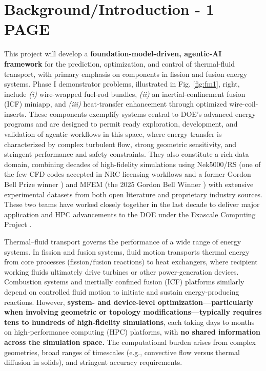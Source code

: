 

\section{Background/Introduction  -   1 PAGE}

This project will develop a {\bf foundation-model-driven, agentic-AI framework}
\cite{Vinuesa2026XAI} for the prediction, optimization, and control of
thermal-fluid transport, with primary emphasis on components in fission and
fusion energy systems.
  Phase I demonstrator problems, illustrated in Fig.  \ref{fig:fm1}, right, 
include 
{\em (i)} wire-wrapped fuel-rod bundles, 
{\em (ii)} an inertial-confinement fusion (ICF) miniapp, and 
{\em (iii)} heat-transfer enhancement through optimized wire-coil-inserts.
  These components exemplify systems central to DOE’s advanced energy
programs and are designed to permit ready exploration, development, and
validation of agentic workflows in this space, where
    energy transfer is characterized by complex turbulent flow, strong
geometric sensitivity, and stringent performance and safety constraints.
  They also constitute a rich data domain, combining decades of high-fidelity
simulations using Nek5000/RS (one of the few CFD codes accepted in NRC
licensing workflows and a former Gordon Bell Prize winner
\cite{tufo99a,gb23}) and MFEM (the 2025 Gordon Bell Winner \cite{gb25mfem}) 
with extensive experimental datasets from both open literature and proprietary
industry sources.  These two teams have worked closely together in the last
decade to deliver major application and HPC advancements to the DOE under the
Exascale Computing Project \cite{ceed}.





Thermal–fluid transport governs the performance of a wide range of energy systems.
In fission and fusion systems, fluid motion transports thermal energy
from core processes (fission/fusion reactions) to heat exchangers, where 
recipient working fluids ultimately drive turbines or other power-generation devices.
Combustion systems and inertially confined fusion (ICF) platforms similarly
depend on controlled fluid motion to initiate and sustain energy-producing
reactions.
However, {\bf system- and device-level optimization—particularly when involving
geometric or topology modifications—typically requires tens to hundreds of
high-fidelity simulations}, each taking days to months on high-performance
computing (HPC) platforms,
with {\bf no shared information across the simulation space.} The computational
burden arises from complex geometries, broad ranges of timescales (e.g.,
convective flow versus thermal diffusion in solids), and stringent accuracy
requirements.

